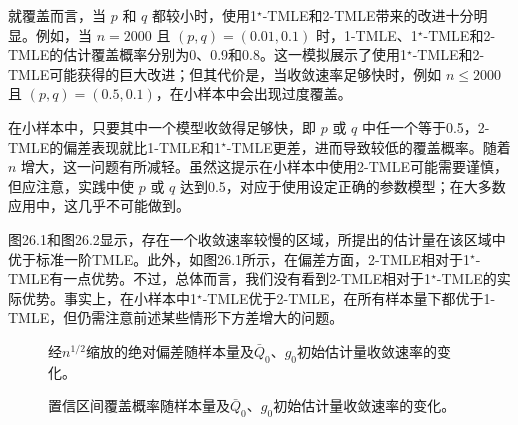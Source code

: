 就覆盖而言，当 $p$ 和 $q$ 都较小时，使用1$^\star$-TMLE和2-TMLE带来的改进十分明显。例如，当 $n=2000$ 且 $(p,q)=(0.01,0.1)$ 时，1-TMLE、1$^\star$-TMLE和2-TMLE的估计覆盖概率分别为0、0.9和0.8。这一模拟展示了使用1$^\star$-TMLE和2-TMLE可能获得的巨大改进；但其代价是，当收敛速率足够快时，例如 $n\le2000$ 且 $(p,q)=(0.5,0.1)$，在小样本中会出现过度覆盖。



在小样本中，只要其中一个模型收敛得足够快，即 $p$ 或 $q$ 中任一个等于0.5，2-TMLE的偏差表现就比1-TMLE和1$^\star$-TMLE更差，进而导致较低的覆盖概率。随着 $n$ 增大，这一问题有所减轻。虽然这提示在小样本中使用2-TMLE可能需要谨慎，但应注意，实践中使 $p$ 或 $q$ 达到0.5，对应于使用设定正确的参数模型；在大多数应用中，这几乎不可能做到。

图26.1和图26.2显示，存在一个收敛速率较慢的区域，所提出的估计量在该区域中优于标准一阶TMLE。此外，如图26.1所示，在偏差方面，2-TMLE相对于1$^\star$-TMLE有一点优势。不过，总体而言，我们没有看到2-TMLE相对于1$^\star$-TMLE的实际优势。事实上，在小样本中1$^\star$-TMLE优于2-TMLE，在所有样本量下都优于1-TMLE，但仍需注意前述某些情形下方差增大的问题。

\begin{figure}[p]
\centering
\resizebox{.91\textwidth}{!}{}
\caption{经$n^{1/2}$缩放的绝对偏差随样本量及$\bar Q_0$、$g_0$初始估计量收敛速率的变化。}
\label{fig:ch26-bias}
\end{figure}

\begin{figure}[p]
\centering
\resizebox{.91\textwidth}{!}{}
\caption{置信区间覆盖概率随样本量及$\bar Q_0$、$g_0$初始估计量收敛速率的变化。}
\label{fig:ch26-coverage}
\end{figure}
\FloatBarrier
